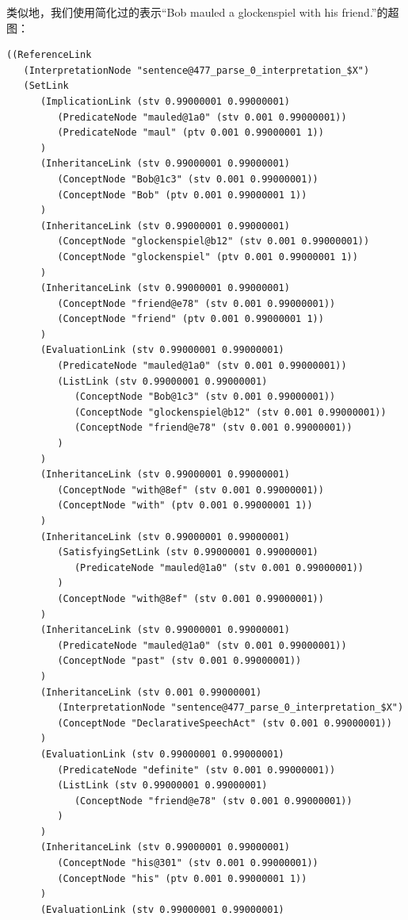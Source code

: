 类似地，我们使用简化过的表示“Bob mauled a glockenspiel with his friend.”的超图：

 {\tt\begin{tiny}\begin{lstlisting}
((ReferenceLink
   (InterpretationNode "sentence@477_parse_0_interpretation_$X")
   (SetLink
      (ImplicationLink (stv 0.99000001 0.99000001)
         (PredicateNode "mauled@1a0" (stv 0.001 0.99000001))
         (PredicateNode "maul" (ptv 0.001 0.99000001 1))
      )
      (InheritanceLink (stv 0.99000001 0.99000001)
         (ConceptNode "Bob@1c3" (stv 0.001 0.99000001))
         (ConceptNode "Bob" (ptv 0.001 0.99000001 1))
      )
      (InheritanceLink (stv 0.99000001 0.99000001)
         (ConceptNode "glockenspiel@b12" (stv 0.001 0.99000001))
         (ConceptNode "glockenspiel" (ptv 0.001 0.99000001 1))
      )
      (InheritanceLink (stv 0.99000001 0.99000001)
         (ConceptNode "friend@e78" (stv 0.001 0.99000001))
         (ConceptNode "friend" (ptv 0.001 0.99000001 1))
      )
      (EvaluationLink (stv 0.99000001 0.99000001)
         (PredicateNode "mauled@1a0" (stv 0.001 0.99000001))
         (ListLink (stv 0.99000001 0.99000001)
            (ConceptNode "Bob@1c3" (stv 0.001 0.99000001))
            (ConceptNode "glockenspiel@b12" (stv 0.001 0.99000001))
            (ConceptNode "friend@e78" (stv 0.001 0.99000001))
         )
      )
      (InheritanceLink (stv 0.99000001 0.99000001)
         (ConceptNode "with@8ef" (stv 0.001 0.99000001))
         (ConceptNode "with" (ptv 0.001 0.99000001 1))
      )
      (InheritanceLink (stv 0.99000001 0.99000001)
         (SatisfyingSetLink (stv 0.99000001 0.99000001)
            (PredicateNode "mauled@1a0" (stv 0.001 0.99000001))
         )
         (ConceptNode "with@8ef" (stv 0.001 0.99000001))
      )
      (InheritanceLink (stv 0.99000001 0.99000001)
         (PredicateNode "mauled@1a0" (stv 0.001 0.99000001))
         (ConceptNode "past" (stv 0.001 0.99000001))
      )
      (InheritanceLink (stv 0.001 0.99000001)
         (InterpretationNode "sentence@477_parse_0_interpretation_$X")
         (ConceptNode "DeclarativeSpeechAct" (stv 0.001 0.99000001))
      )
      (EvaluationLink (stv 0.99000001 0.99000001)
         (PredicateNode "definite" (stv 0.001 0.99000001))
         (ListLink (stv 0.99000001 0.99000001)
            (ConceptNode "friend@e78" (stv 0.001 0.99000001))
         )
      )
      (InheritanceLink (stv 0.99000001 0.99000001)
         (ConceptNode "his@301" (stv 0.001 0.99000001))
         (ConceptNode "his" (ptv 0.001 0.99000001 1))
      )
      (EvaluationLink (stv 0.99000001 0.99000001)

\end{lstlisting}
\end{tiny}}
